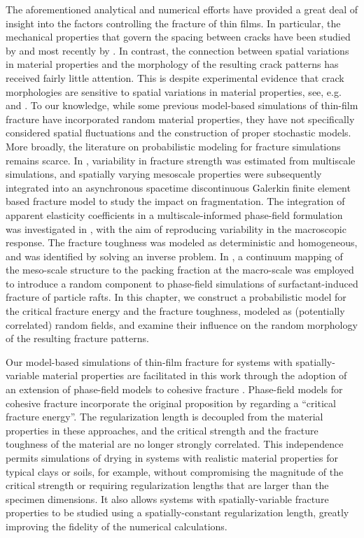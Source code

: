 The aforementioned analytical and numerical efforts have provided a great deal of insight into the factors controlling the fracture of thin films.  In particular, the mechanical properties that govern the spacing between cracks have been studied by \citet{hutchinson1991mixed, xia2000crack} and most recently by \citet{yin2008explicit}. In contrast,  the connection between spatial variations in material properties and the morphology of the resulting crack patterns has received fairly little attention. This is despite experimental evidence that crack morphologies are sensitive to spatial variations in material properties, see, e.g. \citet{kitsunezaki2016shaking, kitsunezaki2017stress, halasz2017effect, kitsunezaki2017memory} and \citet{nakahara2018mechanism}. To our knowledge, while some previous model-based simulations of thin-film fracture have incorporated random material properties, they have not specifically considered spatial fluctuations and the construction of proper stochastic models. More broadly, the literature on probabilistic modeling for fracture simulations remains scarce. In \cite{Acton2018}, variability in fracture strength was estimated from multiscale simulations, and spatially varying mesoscale properties were subsequently integrated into an asynchronous spacetime discontinuous Galerkin finite element based fracture model to study the impact on fragmentation. The integration of apparent elasticity coefficients in a multiscale-informed phase-field formulation was investigated in \cite{Hun2019}, with the aim of reproducing variability in the macroscopic response. The fracture toughness was modeled as deterministic and homogeneous, and was identified by solving an inverse problem. In \cite{Peco2019}, a continuum mapping of the meso-scale structure to the packing fraction at the macro-scale was employed to introduce a random component to phase-field simulations of surfactant-induced fracture of particle rafts. In this chapter, we construct a probabilistic model for the critical fracture energy and the fracture toughness, modeled as (potentially correlated) random fields, and examine their influence on the random morphology of the resulting fracture patterns.

Our model-based simulations of thin-film fracture for systems with spatially-variable material properties are facilitated in this work through the adoption of an extension of phase-field models to cohesive fracture \cite{wu2016thermodynamically, wu2017unified, geelen2019phase}. Phase-field models for cohesive fracture incorporate the original proposition by \citet{xia2000crack} regarding a ``critical fracture energy''. The regularization length is decoupled from the material properties in these approaches, and the critical strength and the fracture toughness of the material are no longer strongly correlated. This independence permits simulations of drying in systems with realistic material properties for typical clays or soils, for example, without compromising the magnitude of the critical strength or requiring  regularization lengths that are larger than the specimen dimensions.  It also allows systems with spatially-variable fracture properties to be studied using a spatially-constant regularization length,  greatly improving the fidelity of the numerical calculations.

